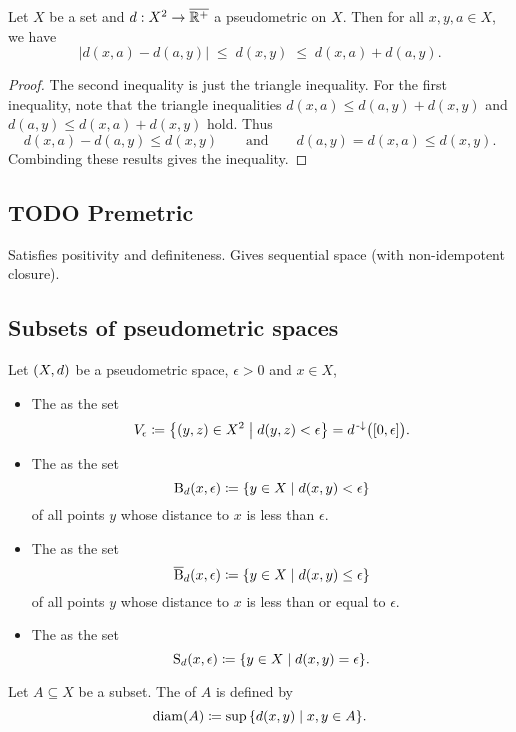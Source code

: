\begin{lemma} \label{metricReverseTriangleInequality}
Let $X$ be a set and $d: X^2\to\overline{\mathbb{R}^+}$ a pseudometric on $X$. Then for all $x,y,a\in X$, we have
\[ \big|d(x,a) - d(a,y)\big| \;\leq\; d(x,y) \;\leq\; d(x,a) + d(a,y). \]
\end{lemma}
\begin{proof}
The second inequality is just the triangle inequality. For the first inequality, note that the triangle inequalities $d(x,a) \leq d(a,y) + d(x,y)$ and $d(a,y)\leq d(x,a) + d(x,y)$ hold. Thus
\[ d(x,a) - d(a,y) \leq d(x,y) \qquad\text{and}\qquad d(a,y) = d(x,a) \leq d(x,y). \]
Combinding these results gives the inequality.
\end{proof}

\subsection{TODO Premetric}
Satisfies positivity and definiteness. Gives sequential space (with non-idempotent closure).

\subsection{Subsets of pseudometric spaces}
\begin{definition}
Let $\sSet{X,d}$ be a pseudometric space, $\epsilon >0$ and $x\in X$,
\begin{itemize}
\item The  as the set
\[ V_\epsilon \defeq \setbuilder{(y,z)\in X^2}{d(y,z)< \epsilon} = d^{\preimf}\big(\interval{0,\epsilon}\big). \]
\item The  as the set
\[ \ball_d(x,\epsilon) \defeq \setbuilder{y\in X}{d(x,y)< \epsilon} \]
of all points $y$ whose distance to $x$ is less than $\epsilon$.
\item The  as the set
\[ \cball_d(x,\epsilon) \defeq \setbuilder{y\in X}{d(x,y)\leq \epsilon} \]
of all points $y$ whose distance to $x$ is less than or equal to $\epsilon$.
\item The  as the set
\[ \sphere_d(x,\epsilon) \defeq \setbuilder{y\in X}{d(x,y) = \epsilon}. \]
\end{itemize}
Let $A\subseteq X$ be a subset. The  of $A$ is defined by
\[ \diam(A) \defeq \sup \setbuilder{d(x,y)}{x,y\in A}. \]
\end{definition}

